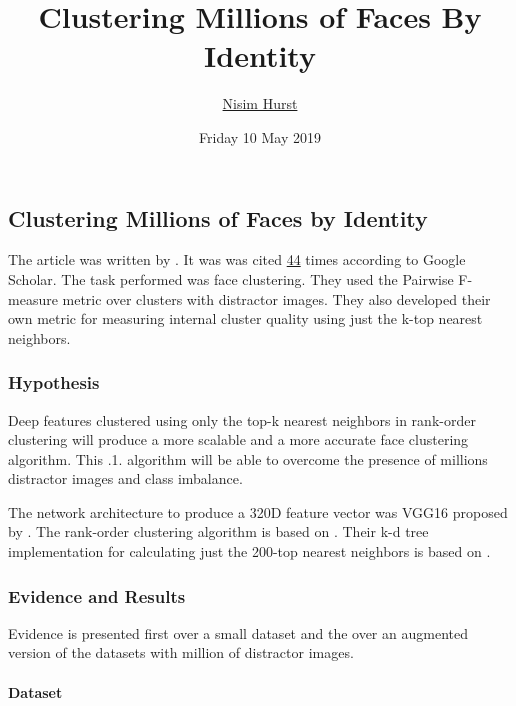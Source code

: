 \documentclass[17pt,]{extarticle}
\title{Clustering Millions of Faces By Identity}
\author{\href{mailto:langheran@gmail.com}{Nisim Hurst}}
\date{Friday 10 May 2019}
\let\oldparagraph\paragraph
\renewcommand{\paragraph}[1]{\oldparagraph{#1}\mbox{}}
\begin{document}
\maketitle

\label{toc}

\hypertarget{clustering-millions-of-faces-by-identity}{%
\subsection{Clustering Millions of Faces by Identity}\label{clustering-millions-of-faces-by-identity}}

The article was written by \autocite{otto2018}. It was was cited \href{https://scholar.google.com/scholar?cites=9743611198042490448\&as_sdt=2005\&sciodt=0,5\&hl=en}{44} times according to Google Scholar. The task performed was face clustering. They used the Pairwise F-measure metric over clusters with distractor images. They also developed their own metric for measuring internal cluster quality using just the k-top nearest neighbors.

\hypertarget{hypothesis}{%
\subsubsection{Hypothesis}\label{hypothesis}}

Deep features clustered using only the top-k nearest neighbors in rank-order clustering will produce a more scalable and a more accurate face clustering algorithm. This .1. algorithm will be able to overcome the presence of millions distractor images and class imbalance.

The network architecture to produce a 320D feature vector was VGG16 proposed by \autocite{Simonyan2014}. The rank-order clustering algorithm is based on \autocite{zhu2011}. Their k-d tree implementation for calculating just the 200-top nearest neighbors is based on \autocite{muja2014}.

\hypertarget{evidence-and-results}{%
\subsubsection{Evidence and Results}\label{evidence-and-results}}

Evidence is presented first over a small dataset and the over an augmented version of the datasets with million of distractor images.

\hypertarget{dataset}{%
\paragraph{Dataset}\label{dataset}}
\end{document}
